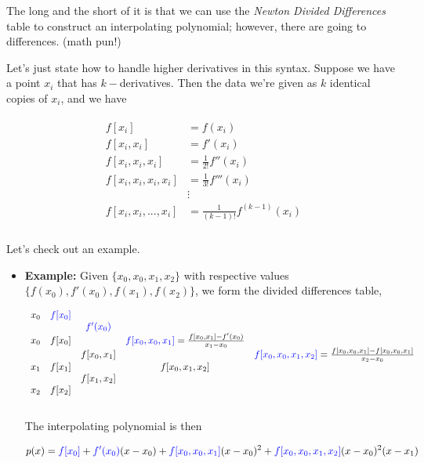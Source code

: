 \documentclass[paper=a4, fontsize=11pt]{scrartcl} %
\numberwithin{equation}{section} %
\numberwithin{figure}{section} %
\numberwithin{table}{section} %
\begin{document}
The long and the short of it is that we can use the \emph{Newton Divided Differences} table to construct an interpolating polynomial; however, there are going to differences. (math pun!)

Let's just state how to handle higher derivatives in this syntax. Suppose we have a point $x_i$ that has $k-$derivatives. Then the data we're given as $k$ identical copies of $x_i$, and we have

\begin{align}
\nonumber
\begin{split}
f[x_i] &= f(x_i) \\
f[x_i,x_i] &= f'(x_i) \\
f[x_i,x_i,x_i] &= \frac{1}{2!} f''(x_i) \\
f[x_i,x_i,x_i,x_i] &= \frac{1}{3!} f'''(x_i) \\
&\vdots \\
f[x_i,x_i,...,x_i] &= \frac{1}{(k-1)!} f^{(k-1)}(x_i) \\
\end{split}
\end{align}

Let's check out an example. 

\begin{itemize}
\item {\bf{Example:}} Given  $\{x_0,x_0,x_1,x_2\}$ with respective values $\{f(x_0),f'(x_0),f(x_1),f(x_2)\}$, we form the divided differences table,

$$\begin{array}{ccccc}
x_0    &{\color{blue}{f[x_0]}} &                                      &  												&\\
           &                                   &{\color{blue}{f'(x_0)}}  &   												&\\
x_0    &f[x_0]                          &				     &{\color{blue}{f[x_0,x_0,x_1]}} = \frac{ f[x_0,x_1] - f'(x_0) }{x_1-x_0} & \\
           &                                  &f[x_0,x_1]		     &  												&{\color{blue}{f[x_0,x_0,x_1,x_2]}} = \frac{f[x_0,x_0,x_1]-f[x_0,x_0,x_1]  }{x_2-x_0}\\
x_1    &f[x_1]                         & 				     &						f[x_0,x_1,x_2] 				          &\\
           &                                  & f[x_1,x_2]	              & 													&  \\
x_2    & f[x_2]           	 	 &				    & 						    						          &\\
\end{array}$$\\

The interpolating polynomial is then 

$$p(x) = {\color{blue}{f[x_0]}} + {\color{blue}{f'(x_0)}} (x-x_0) + {\color{blue}{f[x_0,x_0,x_1]}}(x-x_0)^2+  {\color{blue}{f[x_0,x_0,x_1,x_2]}} (x-x_0)^2 (x-x_1)$$\\
\end{itemize} 
\end{document}
